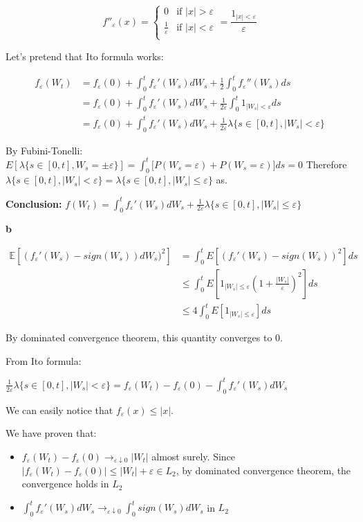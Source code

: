 \documentclass[11pt]{article}
\begin{document}
\[f''_{\varepsilon}(x) = \left\{  \begin{array}{cc}
0 & \text{if } |x| > \varepsilon\\
\frac{1}{\varepsilon} & \text{if } |x| < \varepsilon\\
\end{array}\right. = \frac{1_{|x| < \varepsilon}}{\varepsilon}
\]

Let's pretend that Ito formula works:

\begin{align*}
f_{\varepsilon}(W_t)
&= f_{\varepsilon}(0) + \int_0^t f_{\varepsilon}'(W_s) dW_s + \frac12  \int_0^t f_{\varepsilon}''(W_s) ds
\\&= f_{\varepsilon}(0) + \int_0^t f_{\varepsilon}'(W_s) dW_s + \frac1{2\varepsilon}  \int_0^t 1_{|W_s| < \varepsilon}  ds
\\&= f_{\varepsilon}(0) +\int_0^t f_{\varepsilon}'(W_s) dW_s + \frac1{2\varepsilon}  \lambda\{s \in [0, t], |W_s| < \varepsilon\}
\end{align*}

By Fubini-Tonelli: \(E[\lambda \{s \in [0, t], W_s = \pm \varepsilon\}] = \int_0^t \mathbb [P(W_s = \varepsilon) + P(W_s = \varepsilon)] ds = 0\)
Therefore \(\lambda \{s \in [0, t], |W_s| < \varepsilon\} = \lambda \{s \in [0, t], |W_s| \le \varepsilon\}\) as.

\textbf{Conclusion:} \(f(W_t) = \int_0^t f_{\varepsilon}'(W_s) dW_s + \frac1{2\varepsilon}  \lambda\{s \in [0, t], |W_s| \le \varepsilon\}\)

\textbf{b}

\begin{align*}
\mathbb E[(f_{\varepsilon}'(W_s)-sign(W_s)) dW_s)^2] 
&= \int_0^t E[(f_{\varepsilon}'(W_s) - sign(W_s))^2] ds
\\& \le \int_0^t E[1_{|W_s| \le \varepsilon} (1 + \frac{|W_s|}{\varepsilon})^2] ds
\\& \le 4\int_0^t E[1_{|W_s| \le \varepsilon}] ds
\end{align*}

By dominated convergence theorem, this quantity converges to 0.


From Ito formula:

\(\frac1{2\varepsilon}  \lambda\{s \in [0, t], |W_s| < \varepsilon\} = f_{\varepsilon}(W_t)- f_{\varepsilon}(0) -\int_0^t f_{\varepsilon}'(W_s) dW_s\) 

We can easily notice that \(f_{\varepsilon}(x) \le |x|\).

We have proven that:
\begin{itemize}
\item \(f_{\varepsilon}(W_t) - f_{\varepsilon}(0) \rightarrow_{\varepsilon \downarrow 0} |W_t|\) almost surely. Since \(|f_{\varepsilon}(W_t) - f_{\varepsilon}(0)| \le |W_t| + \varepsilon \in L_2\), by dominated convergence theorem, the convergence holds in \(L_2\)
\item \(\int_0^t f_{\varepsilon}'(W_s) dW_s \rightarrow_{\varepsilon \downarrow 0} \int_0^t sign(W_s) dW_s\) in \(L_2\)
\end{itemize}
\end{document}
